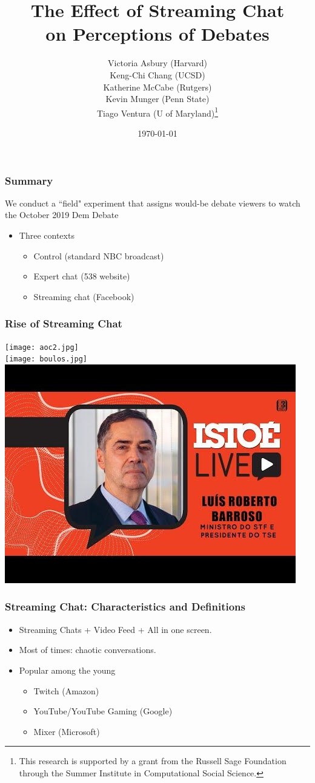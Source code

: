 \documentclass{beamer}
\title{The Effect of Streaming Chat \\ on Perceptions of Debates
}
\subtitle{}
\author{Victoria Asbury (Harvard)\\ Keng-Chi Chang (UCSD)\\ Katherine McCabe (Rutgers) \\
Kevin Munger (Penn State)\\ Tiago Ventura (U of Maryland)\footnote{This research is supported by a grant from the Russell Sage Foundation through the Summer Institute in Computational Social Science.}}
\date{\today}
\institute{FGV-DAPP}
\begin{document}
\begin{frame}
\titlepage
\end{frame}

\begin{frame}
\frametitle{Summary}


We conduct a ``field" experiment that assigns would-be debate viewers to watch the October 2019 Dem Debate

\pause 
\vspace{3mm}
\begin{itemize}
    \item Three contexts \pause 
    \begin{itemize}
        \item Control (standard NBC broadcast)
        \item Expert chat (538 website)
        \item Streaming chat (Facebook)
    \end{itemize}

\end{itemize}
\end{frame}


\begin{frame}
\frametitle{Rise of Streaming Chat}

\centering
\texttt{[image: aoc2.jpg]}\\
\texttt{[image: boulos.jpg]}
\includegraphics[width=.35\linewidth]{istoe.jpg}\\

\end{frame}


\begin{frame}
\frametitle{Streaming Chat: Characteristics and Definitions}

\pause 
\vspace{3mm}
\begin{itemize}
    \item Streaming Chats + Video Feed + All in one screen. \pause
    \item Most of times: chaotic conversations. \pause 
    \item Popular among the young \pause 
    \begin{itemize}
        \item Twitch (Amazon)
        \item YouTube/YouTube Gaming (Google)
        \item Mixer (Microsoft)
    \end{itemize}
    \pause 
\end{itemize}



\end{frame}
\end{document}
